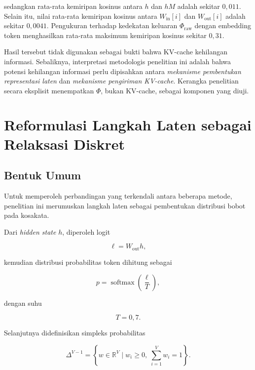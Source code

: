 sedangkan rata-rata kemiripan kosinus antara \(h\) dan \(hM\) adalah sekitar \(0{,}011\). Selain itu, nilai rata-rata kemiripan kosinus antara \(W_{\mathrm{in}}[i]\) dan \(W_{\mathrm{out}}[i]\) adalah sekitar \(0{,}0041\). Pengukuran terhadap kedekatan keluaran \(\Phi_{\mathrm{raw}}\) dengan embedding token menghasilkan rata-rata maksimum kemiripan kosinus sekitar \(0{,}31\).

Hasil tersebut tidak digunakan sebagai bukti bahwa KV-cache kehilangan informasi. Sebaliknya, interpretasi metodologis penelitian ini adalah bahwa potensi kehilangan informasi perlu dipisahkan antara \textit{mekanisme pembentukan representasi laten} dan \textit{mekanisme pengiriman KV-cache}. Kerangka penelitian secara eksplisit menempatkan \(\Phi\), bukan KV-cache, sebagai komponen yang diuji.

\section{Reformulasi Langkah Laten sebagai Relaksasi Diskret}

\subsection{Bentuk Umum}

Untuk memperoleh perbandingan yang terkendali antara beberapa metode, penelitian ini merumuskan langkah laten sebagai pembentukan distribusi bobot pada kosakata.

Dari \textit{hidden state} \(h\), diperoleh logit

\begin{equation}
\ell=W_{\mathrm{out}}h,
\end{equation}

kemudian distribusi probabilitas token dihitung sebagai

\begin{equation}
p
=
\operatorname{softmax}
\left(
\frac{\ell}{T}
\right),
\end{equation}

dengan suhu

\begin{equation}
T=0{,}7.
\end{equation}

Selanjutnya didefinisikan simpleks probabilitas

\begin{equation}
\Delta^{V-1}
=
\left\{
w\in\mathbb{R}^{V}
\mid
w_i\geq0,\;
\sum_{i=1}^{V}w_i=1
\right\}.
\end{equation}

